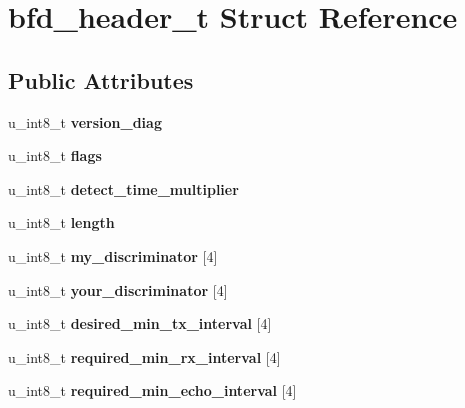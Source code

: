 \hypertarget{structbfd__header__t}{
\section{bfd\_\-header\_\-t Struct Reference}
\label{structbfd__header__t}
}
\subsection*{Public Attributes}
\begin{DoxyCompactItemize}
\item 
\hypertarget{structbfd__header__t_a80bcc6e8227f3c0861e48bb4310f9443}{
u\_\-int8\_\-t {\bfseries version\_\-diag}}
\label{structbfd__header__t_a80bcc6e8227f3c0861e48bb4310f9443}

\item 
\hypertarget{structbfd__header__t_ae2e6d1d03f335694198fdf3cc2980492}{
u\_\-int8\_\-t {\bfseries flags}}
\label{structbfd__header__t_ae2e6d1d03f335694198fdf3cc2980492}

\item 
\hypertarget{structbfd__header__t_a92ce176a7ec1ec7743f90f4efc7e1f25}{
u\_\-int8\_\-t {\bfseries detect\_\-time\_\-multiplier}}
\label{structbfd__header__t_a92ce176a7ec1ec7743f90f4efc7e1f25}

\item 
\hypertarget{structbfd__header__t_a03c85160e88c866e62b375ee0c508d59}{
u\_\-int8\_\-t {\bfseries length}}
\label{structbfd__header__t_a03c85160e88c866e62b375ee0c508d59}

\item 
\hypertarget{structbfd__header__t_ac56636395774c26571cf67e641254781}{
u\_\-int8\_\-t {\bfseries my\_\-discriminator} \mbox{[}4\mbox{]}}
\label{structbfd__header__t_ac56636395774c26571cf67e641254781}

\item 
\hypertarget{structbfd__header__t_afdc49e109c6bb82a8c800beac80d525b}{
u\_\-int8\_\-t {\bfseries your\_\-discriminator} \mbox{[}4\mbox{]}}
\label{structbfd__header__t_afdc49e109c6bb82a8c800beac80d525b}

\item 
\hypertarget{structbfd__header__t_a5ec212850726443d3f2c381415fdb1c5}{
u\_\-int8\_\-t {\bfseries desired\_\-min\_\-tx\_\-interval} \mbox{[}4\mbox{]}}
\label{structbfd__header__t_a5ec212850726443d3f2c381415fdb1c5}

\item 
\hypertarget{structbfd__header__t_ae126987363f179029ebc7ca33613f4fb}{
u\_\-int8\_\-t {\bfseries required\_\-min\_\-rx\_\-interval} \mbox{[}4\mbox{]}}
\label{structbfd__header__t_ae126987363f179029ebc7ca33613f4fb}

\item 
\hypertarget{structbfd__header__t_a524bc13be3de076cdb08200dda53bb01}{
u\_\-int8\_\-t {\bfseries required\_\-min\_\-echo\_\-interval} \mbox{[}4\mbox{]}}
\label{structbfd__header__t_a524bc13be3de076cdb08200dda53bb01}

\end{DoxyCompactItemize}


